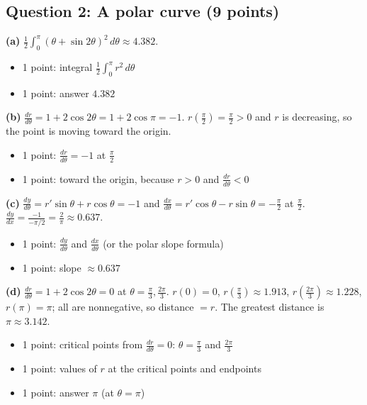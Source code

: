 \documentclass{apcalc}
\begin{document}
\subsection*{Question 2: A polar curve (9 points)}
\textbf{(a)} $\frac12\int_0^\pi(\theta+\sin2\theta)^2\,d\theta\approx4.382$.
\begin{itemize}[leftmargin=1.6em,itemsep=0pt]
\item 1 point: integral $\frac12\int_0^{\pi}r^2\,d\theta$
\item 1 point: answer $4.382$
\end{itemize}
\textbf{(b)} $\frac{dr}{d\theta}=1+2\cos2\theta=1+2\cos\pi=-1$. $r(\frac\pi2)=\frac\pi2>0$ and $r$ is decreasing, so the point is moving toward the origin.
\begin{itemize}[leftmargin=1.6em,itemsep=0pt]
\item 1 point: $\frac{dr}{d\theta}=-1$ at $\frac\pi2$
\item 1 point: toward the origin, because $r>0$ and $\frac{dr}{d\theta}<0$
\end{itemize}
\textbf{(c)} $\frac{dy}{d\theta}=r'\sin\theta+r\cos\theta=-1$ and $\frac{dx}{d\theta}=r'\cos\theta-r\sin\theta=-\frac\pi2$ at $\frac\pi2$. $\frac{dy}{dx}=\frac{-1}{-\pi/2}=\frac2\pi\approx0.637$.
\begin{itemize}[leftmargin=1.6em,itemsep=0pt]
\item 1 point: $\frac{dy}{d\theta}$ and $\frac{dx}{d\theta}$ (or the polar slope formula)
\item 1 point: slope $\approx0.637$
\end{itemize}
\textbf{(d)} $\frac{dr}{d\theta}=1+2\cos2\theta=0$ at $\theta=\frac\pi3,\frac{2\pi}{3}$. $r(0)=0$, $r(\frac\pi3)\approx1.913$, $r(\frac{2\pi}3)\approx1.228$, $r(\pi)=\pi$; all are nonnegative, so distance $=r$. The greatest distance is $\pi\approx3.142$.
\begin{itemize}[leftmargin=1.6em,itemsep=0pt]
\item 1 point: critical points from $\frac{dr}{d\theta}=0$: $\theta=\frac\pi3$ and $\frac{2\pi}3$
\item 1 point: values of $r$ at the critical points and endpoints
\item 1 point: answer $\pi$ (at $\theta=\pi$)
\end{itemize}
\end{document}
